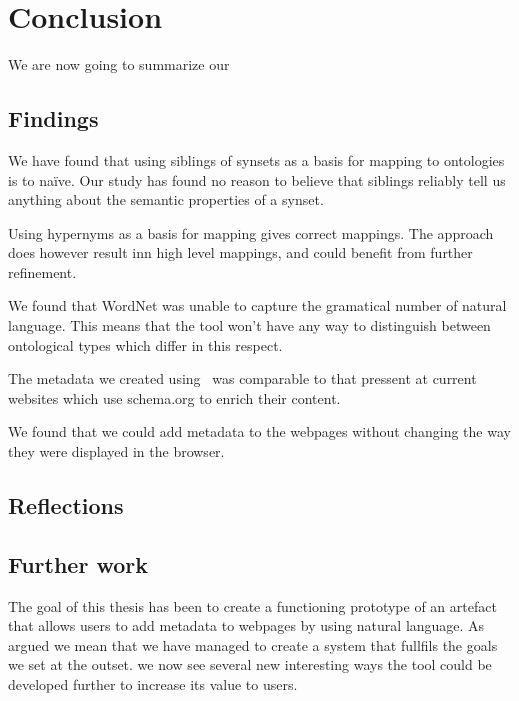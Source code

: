 
\chapter{Conclusion} %
\label{Conclusion} %
We are now going to summarize our

\section{Findings}

We have found that using siblings of synsets as a basis for mapping to ontologies is to naïve.
Our study has found no reason to believe that siblings reliably tell us anything about the semantic properties of a synset.

Using hypernyms as a basis for mapping gives correct mappings.
The approach does however result inn high level mappings, and could benefit from further refinement.

We found that WordNet was unable to capture the gramatical number of natural language.
This means that the tool won't have any way to distinguish between ontological types which differ in this respect.

The metadata we created using \theartefact\ was comparable to that pressent at current websites which use schema.org to
enrich their content.

We found that we could add metadata to the webpages without changing the way they were displayed in the browser.

\section{Reflections}

\section{Further work}
The goal of this thesis has been to create a functioning prototype of an artefact that allows users to add metadata
to webpages by using natural language.
As argued we mean that we have managed to create a system that fullfils the goals we set at the outset.
we now see several new interesting ways the tool could be developed further to increase its value to users.

